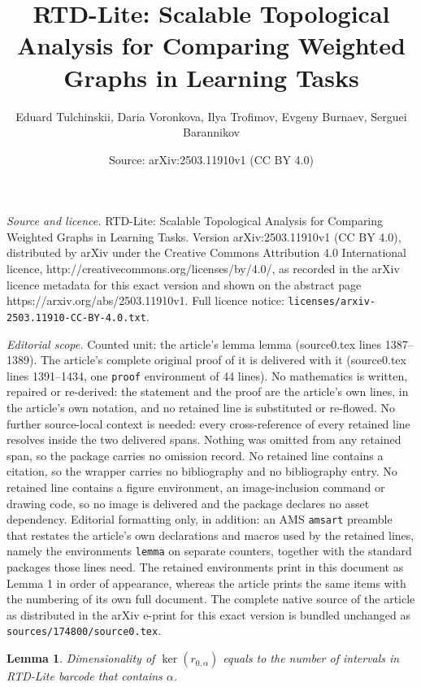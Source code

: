 \documentclass[10pt,a4paper]{amsart}
\title{RTD-Lite: Scalable Topological Analysis for Comparing Weighted Graphs in Learning Tasks}
\author{Eduard Tulchinskii, Daria Voronkova, Ilya Trofimov, Evgeny Burnaev, Serguei Barannikov}
\date{Source: arXiv:2503.11910v1 (CC BY 4.0)}
\newtheorem{lemma}{Lemma}
\begin{document}
\maketitle

\noindent\emph{Source and licence.} RTD-Lite: Scalable Topological Analysis for Comparing Weighted Graphs in Learning Tasks. Version arXiv:2503.11910v1 (CC BY 4.0), distributed by arXiv under the Creative Commons Attribution 4.0 International licence, http://creativecommons.org/licenses/by/4.0/, as recorded in the arXiv licence metadata for this exact version and shown on the abstract page https://arxiv.org/abs/2503.11910v1. Full licence notice: \texttt{licenses/arxiv-2503.11910-CC-BY-4.0.txt}.\par\smallskip

\noindent\textit{Editorial scope.} Counted unit: the article's lemma lemma (source0.tex lines 1387--1389). The article's complete original proof of it is delivered with it (source0.tex lines 1391--1434, one \texttt{proof} environment of 44 lines). No mathematics is written, repaired or re-derived: the statement and the proof are the article's own lines, in the article's own notation, and no retained line is substituted or re-flowed.  No further source-local context is needed: every cross-reference of every retained line resolves inside the two delivered spans.  Nothing was omitted from any retained span, so the package carries no omission record.  No retained line contains a citation, so the wrapper carries no bibliography and no bibliography entry.  No retained line contains a figure environment, an image-inclusion command or drawing code, so no image is delivered and the package declares no asset dependency.  Editorial formatting only, in addition: an AMS \texttt{amsart} preamble that restates the article's own declarations and macros used by the retained lines, namely the environments \texttt{lemma} on separate counters, together with the standard packages those lines need.  The retained environments print in this document as Lemma 1 in order of appearance, whereas the article prints the same items with the numbering of its own full document.  The complete native source of the article as distributed in the arXiv e-print for this exact version is bundled unchanged as \texttt{sources/174800/source0.tex}.
\begin{lemma}
Dimensionality of $\ker{(r_{0, \alpha})}$ equals to the number of intervals in RTD-Lite barcode that contains \nolinebreak $\alpha$.
\end{lemma}
\end{document}

